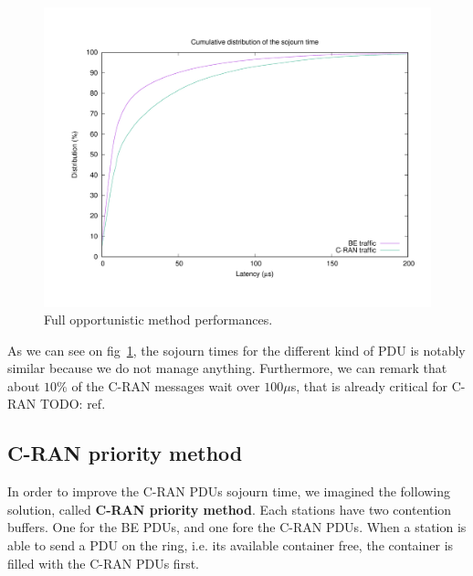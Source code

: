 \documentclass[]{algotel}
\newcommand{\todo}[1]{{\color{red} TODO: {#1}}}
\begin{document}
    \begin{figure}[h!]
    \label{fig:oport}
        \begin{center}
      \includegraphics[scale=0.4]{oport}

      \caption{Full opportunistic method performances.}
      \end{center}
  \end{figure}
  
  As we can see on fig~\ref{fig:oport}, the sojourn times for the different kind of PDU is notably similar because we do not manage anything. Furthermore, we can remark that about $10\%$ of the C-RAN messages wait over $100\mu$s, that is already critical for C-RAN \todo{ref}.

\subsection{C-RAN priority method}
\label{sec:cranprio}
  In order to improve the C-RAN PDUs sojourn time, we imagined the following solution, called {\bf C-RAN priority method}. Each stations have two contention buffers. One for the BE PDUs, and one fore the C-RAN PDUs. When a station is able to send a PDU on the ring, i.e. its available container free, the container is filled with the C-RAN PDUs first. 
  
\end{document}
